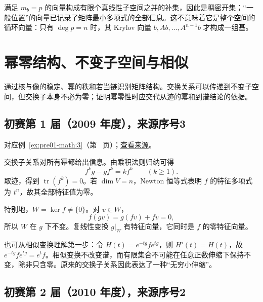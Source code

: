 \documentclass[12pt,fontset=fandol]{ctexart}
\begin{document}
\begin{remark}[方法与条件]

满足 $m_b=p$ 的向量构成有限个真线性子空间之并的补集，因此是稠密开集；“一般位置”的向量已记录了矩阵最小多项式的全部信息。这不意味着它是整个空间的循环向量：只有 $\deg p=n$ 时，其 Krylov 向量 $b,Ab,\dots,A^{n-1}b$ 才构成一组基。

\end{remark}

\section{幂零结构、不变子空间与相似}

\label{sec:solutions-6}

通过核与像的稳定、幂的秩和若当链识别矩阵结构。交换关系可以传递到不变子空间，但交换子本身不必为零；证明幂零性时应交代从迹的幂和到谱结论的依据。

\subsection{初赛第 1 届（2009 年度），来源序号3}\label{ans:pre01-math:3}\label{pr:pre01-math:3}

对应例~\ref{ex:pre01-math:3}（第~\pageref{ex:pre01-math:3} 页）；\href{https://github.com/lzxcr/cmc-mathematics/blob/64916fa1fdbc3e444a652eca204d5669058ee321/src/problems/preliminary/01/03.md}{查看来源}。

\begin{solve}

交换子关系对所有幂都给出信息。由乘积法则归纳可得
\[
f^kg-gf^k=kf^k\qquad(k\ge1).
\]
取迹，得到 $\operatorname{tr}(f^k)=0$。若 $\dim V=n$，Newton 恒等式表明 $f$ 的特征多项式为 $t^n$，故其全部特征值为零。

特别地，$W=\ker f\ne\{0\}$。对 $v\in W$，
\[
f(gv)=g(fv)+fv=0,
\]
所以 $W$ 在 $g$ 下不变。复线性变换 $g|_W$ 有特征向量，它同时是 $f$ 的零特征向量。

\end{solve}

\begin{remark}[方法与条件]

也可从相似变换理解第一步：令 $H(t)=e^{-tg}fe^{tg}$，则 $H'(t)=H(t)$，故 $e^{-tg}fe^{tg}=e^tf$。相似变换不改变谱，而有限集合不可能在任意正数伸缩下保持不变，除非只含零。原来的交换子关系因此表达了一种“无穷小伸缩”。

\end{remark}

\subsection{初赛第 2 届（2010 年度），来源序号2}\label{ans:pre02-math:2}\label{pr:pre02-math:2}
\end{document}
